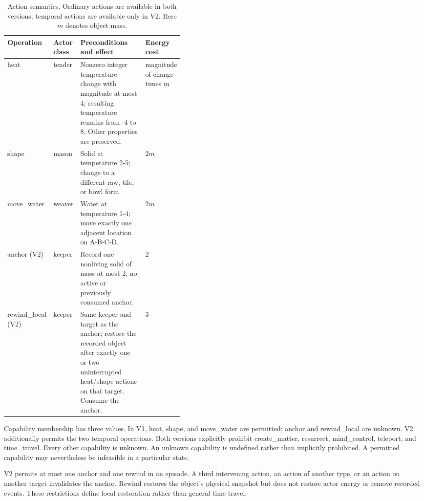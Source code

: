 \documentclass[preprint,12pt,numbers,nopreprintline]{elsarticle}
\begin{document}
\begin{table}[htbp]
\caption{Action semantics. Ordinary actions are available in both versions; temporal actions are available only in V2. Here $m$ denotes object mass.}
\label{tab:actions}
\centering
\small
\renewcommand{\arraystretch}{1.12}
\begin{tabularx}{\linewidth}{@{}L{0.16\linewidth}L{0.11\linewidth}YL{0.15\linewidth}@{}}
\toprule
\textbf{Operation} & \textbf{Actor class} & \textbf{Preconditions and effect} & \textbf{Energy cost} \\
\midrule
heat & tender & Nonzero integer temperature change with magnitude at most 4; resulting temperature remains from -4 to 8. Other properties are preserved. & magnitude of change times m \\
\addlinespace[3pt]
shape & mason & Solid at temperature 2-5; change to a different raw, tile, or bowl form. & $2m$ \\
\addlinespace[3pt]
move\_water & weaver & Water at temperature 1-4; move exactly one adjacent location on A-B-C-D. & $2m$ \\
\addlinespace[3pt]
anchor (V2) & keeper & Record one nonliving solid of mass at most 2; no active or previously consumed anchor. & 2 \\
\addlinespace[3pt]
rewind\_local (V2) & keeper & Same keeper and target as the anchor; restore the recorded object after exactly one or two uninterrupted heat/shape actions on that target. Consume the anchor. & 3 \\
\bottomrule
\end{tabularx}
\end{table}

Capability membership has three values. In V1, heat, shape, and move\_water are permitted; anchor and rewind\_local are unknown. V2 additionally permits the two temporal operations. Both versions explicitly prohibit create\_matter, resurrect, mind\_control, teleport, and time\_travel. Every other capability is unknown. An unknown capability is undefined rather than implicitly prohibited. A permitted capability may nevertheless be infeasible in a particular state.

V2 permits at most one anchor and one rewind in an episode. A third intervening action, an action of another type, or an action on another target invalidates the anchor. Rewind restores the object's physical snapshot but does not restore actor energy or remove recorded events. These restrictions define local restoration rather than general time travel.
\end{document}

